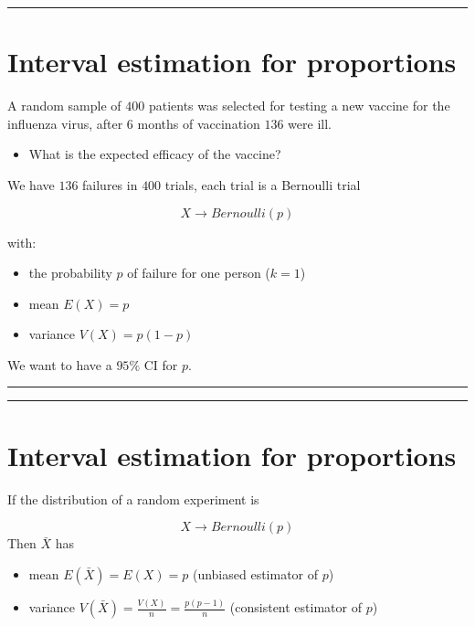 \documentclass[
]{book}
\providecommand{\tightlist}{%
  \setlength{\itemsep}{0pt}\setlength{\parskip}{0pt}}
\begin{document}
\begin{center}\rule{0.5\linewidth}{0.5pt}\end{center}

\hypertarget{interval-estimation-for-proportions}{%
\section{Interval estimation for proportions}\label{interval-estimation-for-proportions}}

A random sample of \(400\) patients was selected for testing a new vaccine for the influenza virus, after \(6\) months of vaccination \(136\) were ill.~

\begin{itemize}
\tightlist
\item
  What is the expected efficacy of the vaccine?
\end{itemize}

We have \(136\) failures in \(400\) trials, each trial is a
Bernoulli trial

\[X \rightarrow Bernoulli(p)\]

with:

\begin{itemize}
\tightlist
\item
  the probability \(p\) of failure for one person (\(k=1\))
\item
  mean \(E (X) = p\)
\item
  variance \(V (X) = p (1-p)\)
\end{itemize}

We want to have a \(95\%\) CI for \(p\).

\begin{center}\rule{0.5\linewidth}{0.5pt}\end{center}

\begin{center}\rule{0.5\linewidth}{0.5pt}\end{center}

\hypertarget{interval-estimation-for-proportions-1}{%
\section{Interval estimation for proportions}\label{interval-estimation-for-proportions-1}}

If the distribution of a random experiment is

\[X \rightarrow Bernoulli (p)\]
Then \(\bar{X}\) has

\begin{itemize}
\tightlist
\item
  mean \(E(\bar{X})=E(X)=p\) (unbiased estimator of \(p\))\\
\item
  variance \(V(\bar{X})=\frac{V(X)}{n}=\frac{p(p-1)}{n}\) (consistent estimator of \(p\))
\end{itemize}
\end{document}
